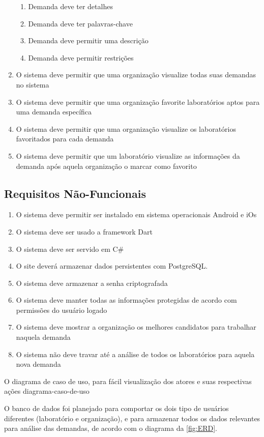 \begin{enumerate}
\begin{enumerate}
		\item Demanda deve ter detalhes
		\item Demanda deve ter palavras-chave
		\item Demanda deve permitir uma descrição
		\item Demanda deve permitir restrições
	\end{enumerate}
	\item O sistema deve permitir que uma organização visualize todas suas demandas no sistema
	\item O sistema deve permitir que uma organização favorite laboratórios aptos para uma demanda específica
	\item O sistema deve permitir que uma organização visualize os laboratórios favoritados para cada demanda
	\item O sistema deve permitir que um laboratório visualize as informações da demanda após aquela organização o marcar como favorito
\end{enumerate}

\subsection{Requisitos Não-Funcionais}\label{subsec:rnf}
\begin{enumerate}
\item O sistema deve permitir ser instalado em sistema operacionais Android e iOs
\item O sistema deve ser usado a framework Dart
\item O sistema deve ser servido em C\#
\item O site deverá armazenar dados persistentes com PostgreSQL.
\item O sistema deve armazenar a senha criptografada
\item O sistema deve manter todas as informações protegidas de acordo com permissões do usuário logado
\item O sistema deve mostrar a organização os melhores candidatos para trabalhar naquela demanda
\item O sistema não deve travar até a análise de todos os laboratórios para aquela nova demanda
\end{enumerate}

O diagrama de caso de uso, para fácil visualização dos atores e suas respectivas ações {{diagrama-caso-de-uso}}

O banco de dados foi planejado para comportar os dois tipo de usuários diferentes (laboratório e organização), e para armazenar todos os dados relevantes para análise das demandas, de acordo com o diagrama da \autoref{fig:ERD}.

